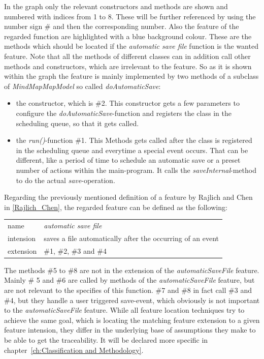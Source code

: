 In the graph only the relevant constructors and methods are shown and numbered with indices from 1 to 8. These will be further referenced by using the number sign \# and then the corresponding number. Also the feature of the regarded function are highlighted with a blue background colour. These are the methods which should be located if the \emph{automatic save file} function is the wanted feature. Note that all the methods of different classes can in addition call other methods and constructors, which are irrelevant to the feature.
So as it is shown within the graph the feature is mainly implemented by two methods of a subclass of \emph{MindMapMapModel} so called \emph{doAutomaticSave}:
\begin{itemize} 
\item the constructor, which is \#2. This constructor gets a few parameters to configure the \emph{doAutomaticSave}-function and registers the class in the scheduling queue, so that it gets called.
\item the \emph{run()}-function \#1. This Methods gets called after the class is registered in the scheduling queue and everytime a special event occurs. That can be different, like a period of time to schedule an automatic save or a preset number of actions within the main-program. It calls the \emph{saveInternal}-method to do the actual \textit{save}-operation.
\end{itemize}

\newpage
Regarding the previously mentioned definition of a feature by Rajlich and Chen in \autoref{Rajlich_Chen}, the regarded feature can be defined as the following: \newline
\begin{tabular}{ l  l }
  name & \emph{automatic save file}  \\
  intension & saves a file automatically after the occurring of an event\\
 extension & \#1,  \#2, \#3 and \#4\\
\end{tabular}
The methods \#5 to \#8 are not in the extension of the \emph{automaticSaveFile} feature.
Mainly \# 5 and \#6 are called by methods of the \emph{automaticSaveFile} feature, but are not relevant to the specifies of this function.
\#7 and \#8 in fact call \#3 and \#4, but they handle a user triggered save-event, which obviously is not important to the \emph{automaticSaveFile} feature.
\newline \newline
While all feature location techniques try to achieve the same goal, which is locating the matching feature extension to a given feature intension, they differ in the underlying base of assumptions they make to be able to get the traceability. It will be declared more specific in chapter~\ref{ch:Classification and Methodology}. 
